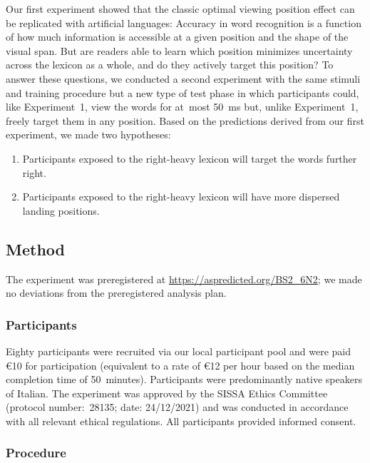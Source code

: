 \documentclass[doc,biblatex,floatsintext]{apa7}
\begin{document}
Our first experiment showed that the classic optimal viewing position effect can be replicated with artificial languages: Accuracy in word recognition is a function of how much information is accessible at a given position and the shape of the visual span. But are readers able to learn which position minimizes uncertainty across the lexicon as a whole, and do they actively target this position? To answer these questions, we conducted a second experiment with the same stimuli and training procedure but a new type of test phase in which participants could, like Experiment~1, view the words for at~most 50~ms but, unlike Experiment~1, freely target them in any position. Based on the predictions derived from our first experiment, we made two hypotheses:
\begin{enumerate}
    \item Participants exposed to the right-heavy lexicon will target the words further right.
    \item Participants exposed to the right-heavy lexicon will have more dispersed landing positions.
\end{enumerate}

\subsection{Method}

The experiment was preregistered at \url{https://aspredicted.org/BS2_6N2}; we made no deviations from the preregistered analysis plan.

\subsubsection{Participants}

Eighty participants were recruited via our local participant pool and were paid €10 for participation (equivalent to a rate of €12 per hour based on the median completion time of 50~minutes). Participants were predominantly native speakers of Italian. The experiment was approved by the SISSA Ethics Committee (protocol number:~28135; date: 24/12/2021) and was conducted in accordance with all relevant ethical regulations. All participants provided informed consent.

\subsubsection{Procedure}
\end{document}
